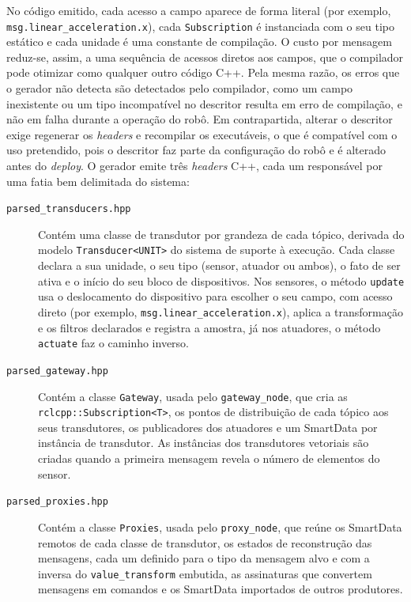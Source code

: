 \documentclass[
    12pt,
    oneside,
    a4paper,
    chapter=TITLE,
    section=TITLE,
    english,
    brazil
]{abntex2}
\begin{document}
No código emitido, cada acesso a campo aparece de forma literal (por
exemplo, \texttt{msg.linear\_acceleration.x}), cada
\texttt{Subscription} é instanciada com o seu tipo estático e cada
unidade é uma constante de compilação. O custo por mensagem reduz-se,
assim, a uma sequência de acessos diretos aos campos, que o compilador
pode otimizar como qualquer outro código C++. Pela mesma razão, os erros
que o gerador não detecta são detectados pelo compilador, como um campo
inexistente ou um tipo incompatível no descritor resulta em erro de
compilação, e não em falha durante a operação do robô. Em contrapartida,
alterar o descritor exige regenerar os \textit{headers} e recompilar os
executáveis, o que é compatível com o uso pretendido, pois o descritor
faz parte da configuração do robô e é alterado antes do
\textit{deploy}. O gerador emite três \textit{headers} C++, cada um
responsável por uma fatia bem delimitada do sistema:

\begin{description}
\item[\texttt{parsed\_transducers.hpp}] Contém uma classe de transdutor
por grandeza de cada tópico, derivada do modelo \texttt{Transducer<UNIT>}
do sistema de suporte à execução. Cada classe declara a sua unidade, o seu
tipo (sensor, atuador ou ambos), o fato de ser ativa e o início do seu
bloco de dispositivos. Nos sensores, o método \texttt{update} usa o
deslocamento do dispositivo para escolher o seu campo, com acesso direto
(por exemplo, \texttt{msg.linear\_acceleration.x}), aplica a
transformação e os filtros declarados e registra a amostra, já nos
atuadores, o método \texttt{actuate} faz o caminho inverso.

\item[\texttt{parsed\_gateway.hpp}] Contém a classe \texttt{Gateway},
usada pelo \texttt{gateway\_node}, que cria as
\texttt{rclcpp::Subscription<T>}, os pontos de distribuição de
cada tópico aos seus transdutores, os publicadores dos atuadores e um
SmartData por instância de transdutor. As instâncias dos transdutores
vetoriais são criadas quando a primeira mensagem revela o número de
elementos do sensor.

\item[\texttt{parsed\_proxies.hpp}] Contém a classe \texttt{Proxies},
usada pelo \texttt{proxy\_node}, que reúne os SmartData remotos de cada
classe de transdutor, os estados de reconstrução das mensagens, cada um
definido para o tipo da mensagem alvo e com a inversa do
\texttt{value\_transform} embutida, as assinaturas que convertem
mensagens em comandos e os SmartData importados de outros produtores.
\end{description}
\end{document}
